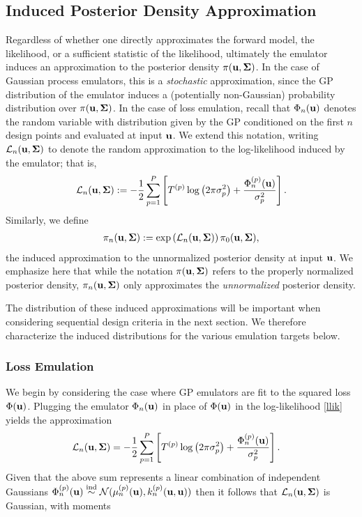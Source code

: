 \documentclass[12pt]{article}
\begin{document}
\subsection{Induced Posterior Density Approximation}
Regardless of whether one directly approximates the forward model, the likelihood, or a sufficient statistic of the likelihood, ultimately the emulator induces an approximation to the posterior 
density $\pi(\mathbf{u}, \boldsymbol{\Sigma})$. In the case of Gaussian process emulators, this is a \textit{stochastic} approximation, since the GP distribution of the emulator induces 
a (potentially non-Gaussian) probability distribution over $\pi(\mathbf{u}, \boldsymbol{\Sigma})$. In the case of loss emulation, recall that ${\Phi}_{n}(\mathbf{u})$ denotes the random 
variable with distribution given by the GP conditioned on the first $n$ design points and evaluated at input $\mathbf{u}$. We extend this notation, writing $\mathcal{L}_{n}(\mathbf{u}, \boldsymbol{\Sigma})$ 
to denote the random approximation to the log-likelihood induced by the emulator; that is, 
\begin{align}
\mathcal{L}_{n}(\mathbf{u}, \boldsymbol{\Sigma}) := -\frac{1}{2} \sum_{p = 1}^{P} \left[{T}^{(p)} \log\left(2\pi \sigma_{p}^2 \right) + \frac{{\Phi}^{(p)}_{n}(\mathbf{u})}{\sigma_{p}^2} \right].
\end{align}
Similarly, we define 
\begin{align*}
\pi_{n}(\mathbf{u}, \boldsymbol{\Sigma}) := \exp\left(\mathcal{L}_{n}(\mathbf{u}, \boldsymbol{\Sigma})\right) \pi_0(\mathbf{u}, \boldsymbol{\Sigma}),
\end{align*}
the induced approximation to the unnormalized posterior density at input $\mathbf{u}$. We emphasize here that while the notation $\pi(\mathbf{u}, \boldsymbol{\Sigma})$ refers to the 
properly normalized posterior density, $\pi_{n}(\mathbf{u}, \boldsymbol{\Sigma})$ only approximates the \textit{unnormalized} posterior density. 

The distribution of 
these induced approximations will be important when considering sequential design criteria in the next section. We therefore characterize the induced distributions for the various emulation 
targets below. 

\subsubsection{Loss Emulation}
We begin by considering the case where GP emulators are fit to the squared loss $\Phi(\mathbf{u})$.
Plugging the emulator $\Phi_n(\mathbf{u})$ in place of $\Phi(\mathbf{u})$ in the log-likelihood
\ref{llik} yields the approximation 
\begin{align*}
\mathcal{L}_{n}(\mathbf{u}, \boldsymbol{\Sigma}) &= -\frac{1}{2} \sum_{p = 1}^{P} \left[{T}^{(p)} \log\left(2\pi \sigma_{p}^2 \right) + \frac{{\Phi}^{(p)}_{n}(\mathbf{u})}{\sigma_{p}^2} \right].
\end{align*}
Given that the above sum represents a linear combination of independent Gaussians 
${\Phi}^{(p)}_{n}(\mathbf{u}) \overset{\text{ind}}{\sim} \mathcal{N}(\mu_{n}^{(p)}(\mathbf{u}), k_{n}^{(p)}(\mathbf{u}, \mathbf{u}))$ then it follows that 
$\mathcal{L}_{n}(\mathbf{u}, \boldsymbol{\Sigma})$ is Gaussian, with moments 
\end{document}
